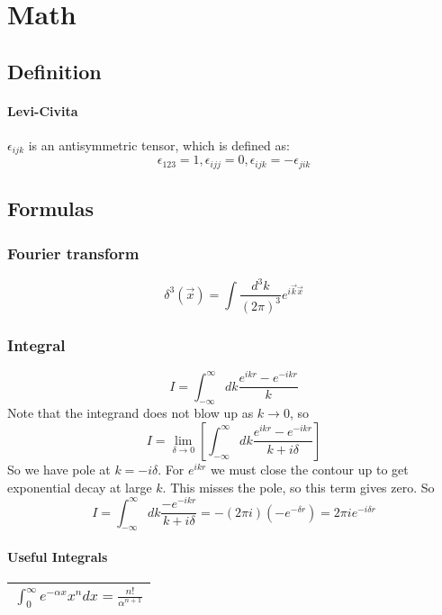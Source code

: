\chapter{Math}

\section{Definition}
\subsubsection{Levi-Civita}
$\epsilon_{ijk}$ is an antisymmetric tensor, which is defined as: 
\[  \epsilon_{123} = 1, \epsilon_{ijj} = 0, \epsilon_{ijk} = -\epsilon_{jik} \]


\section{Formulas}

\subsection{Fourier transform}
\[
    \delta^3(\vec{x})=\int\frac{d^3k}{(2\pi)^3}e^{i\vec{k}\vec{x}}
    \]

\subsection{Integral}
\[
    I=\int_{-\infty}^{\infty}dk\frac{e^{ikr}-e^{-ikr}}{k}
    \]
Note that the integrand does not blow up as $k \rightarrow 0$, so
\[
    I=\displaystyle\lim_{\delta\rightarrow{0}}\left[\int_{-\infty}^{\infty}dk\frac{e^{ikr}-e^{-ikr}}{k+i\delta}\right]
    \]
So we have pole at $k = -i\delta$. For $e^{ikr}$ we must close the contour
up to get exponential decay at large $\mathit{k}$. This misses the pole, so
this term gives zero. So
\[
    I=\int_{-\infty}^{\infty}dk\frac{-e^{-ikr}}{k+i\delta}=-(2\pi{i})(-e^{-\delta{r}})=2\pi{i}e^{-i\delta{r}}
    \]

\subsubsection{Useful Integrals}
\begin{table}[htp]
    \begin{center}
    \begin{tabular}{c}
	\hline
	    $ \int_0^\infty e^{-\alpha x}x^ndx = \frac{n!}{\alpha^{n+1}} $  \\
	\hline
    \end{tabular}
    \end{center}
\end{table}
